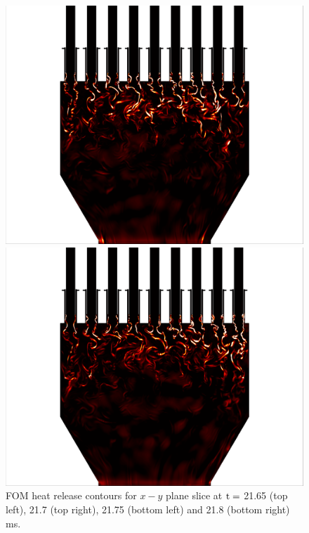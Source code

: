 \begin{figure}
	\begin{minipage}{0.49\linewidth}
		\includegraphics[width=0.99\linewidth,trim={0.5em 0em 6cm 0em},clip]{Chapters/HPROMResults/Images/nineElem/example_snaps/example_heat_z_217500.png}
	\end{minipage}
	\begin{minipage}{0.49\linewidth}
		\includegraphics[width=0.99\linewidth,trim={6cm 0em 0.5em 0em},clip]{Chapters/HPROMResults/Images/nineElem/example_snaps/example_heat_z_218000.png}
	\end{minipage}
	\caption{\label{fig:nineElemFOMHeat}FOM heat release contours for $x-y$ plane slice at $\text{t} = $ 21.65 (top left), 21.7 (top right), 21.75 (bottom left) and 21.8 (bottom right) ms.}
\end{figure}

